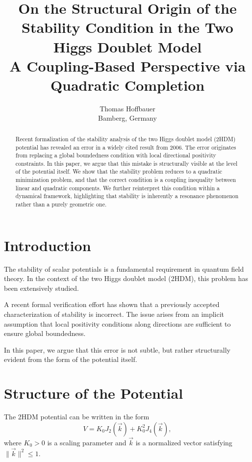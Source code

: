 \documentclass[11pt,a4paper]{article}
\title{
	On the Structural Origin of the Stability Condition in the Two Higgs Doublet Model \\
	\large A Coupling-Based Perspective via Quadratic Completion
}
\author{
	Thomas Hoffbauer\\
	\small Bamberg, Germany
}
\date{}
\begin{document}
	
	\maketitle
	
	\begin{abstract}
		Recent formalization of the stability analysis of the two Higgs doublet model (2HDM) potential has revealed an error in a widely cited result from 2006. The error originates from replacing a global boundedness condition with local directional positivity constraints. In this paper, we argue that this mistake is structurally visible at the level of the potential itself. We show that the stability problem reduces to a quadratic minimization problem, and that the correct condition is a coupling inequality between linear and quadratic components. We further reinterpret this condition within a dynamical framework, highlighting that stability is inherently a resonance phenomenon rather than a purely geometric one.
	\end{abstract}
	
	\section{Introduction}
	
	The stability of scalar potentials is a fundamental requirement in quantum field theory. In the context of the two Higgs doublet model (2HDM), this problem has been extensively studied.
	
	A recent formal verification effort has shown that a previously accepted characterization of stability is incorrect. The issue arises from an implicit assumption that local positivity conditions along directions are sufficient to ensure global boundedness.
	
	In this paper, we argue that this error is not subtle, but rather structurally evident from the form of the potential itself.
	
	\section{Structure of the Potential}
	
	The 2HDM potential can be written in the form
	\begin{equation}
		V = K_0 J_2(\vec{k}) + K_0^2 J_4(\vec{k}),
	\end{equation}
	where $K_0 > 0$ is a scaling parameter and $\vec{k}$ is a normalized vector satisfying $\|\vec{k}\|^2 \leq 1$.
	
\end{document}
